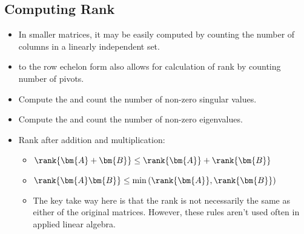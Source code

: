 \begin{itemize}
    
    \subsection{Computing Rank}\label{Computing Rank}
    \begin{itemize}
      \item In smaller matrices, it may be easily computed by counting the number of columns in a linearly independent set.
      \item \hyperref[Row Echelon form]{} to the row echelon form also allows for calculation of rank by counting number of pivots.
      \item Compute the \hyperref[tbd]{} and count the number of non-zero singular values.
      \item Compute the \hyperref[tbd]{} and count the number of non-zero eigenvalues.
      \item Rank after addition and multiplication:
      \begin{itemize}
        \item \(\rank{\bm{A}+\bm{B}} \leq \rank{\bm{A}} + \rank{\bm{B}} \)
        \item \(\rank{\bm{A}\bm{B}} \leq \min{(\rank{\bm{A}},\rank{\bm{B}})} \)
        \item The key take way here is that the rank is not necessarily the same as either of the original matrices. However, these rules aren't used often in applied linear algebra.
      \end{itemize}
  \end{itemize}
      
\end{itemize}


